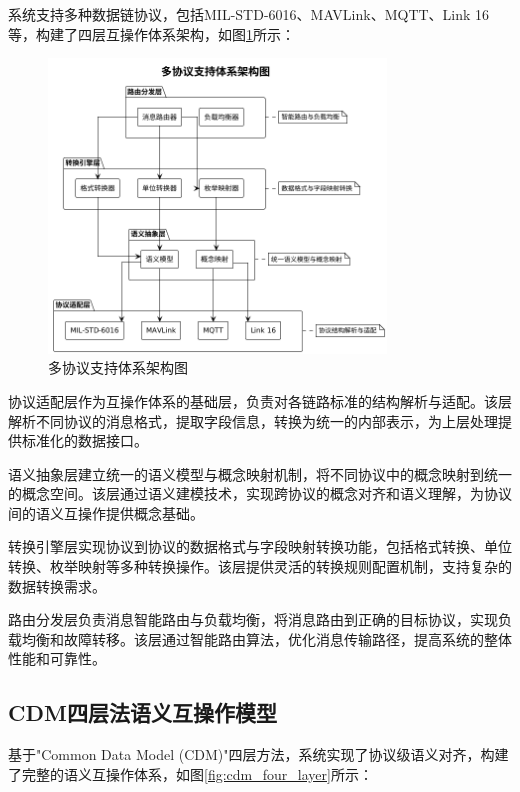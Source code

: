 系统支持多种数据链协议，包括MIL-STD-6016、MAVLink、MQTT、Link 16等，构建了四层互操作体系架构，如图\ref{fig:multi_protocol_support}所示：

\begin{figure}[H]
    \centering
    \includegraphics[width=0.8\textwidth]{chapters/fig-0/multi_protocol_support_simple.png}
    \caption{多协议支持体系架构图}
    \label{fig:multi_protocol_support}
\end{figure}

协议适配层作为互操作体系的基础层，负责对各链路标准的结构解析与适配。该层解析不同协议的消息格式，提取字段信息，转换为统一的内部表示，为上层处理提供标准化的数据接口。

语义抽象层建立统一的语义模型与概念映射机制，将不同协议中的概念映射到统一的概念空间。该层通过语义建模技术，实现跨协议的概念对齐和语义理解，为协议间的语义互操作提供概念基础。

转换引擎层实现协议到协议的数据格式与字段映射转换功能，包括格式转换、单位转换、枚举映射等多种转换操作。该层提供灵活的转换规则配置机制，支持复杂的数据转换需求。

路由分发层负责消息智能路由与负载均衡，将消息路由到正确的目标协议，实现负载均衡和故障转移。该层通过智能路由算法，优化消息传输路径，提高系统的整体性能和可靠性。

\subsection{CDM四层法语义互操作模型}

基于"Common Data Model (CDM)"四层方法，系统实现了协议级语义对齐，构建了完整的语义互操作体系，如图\ref{fig:cdm_four_layer}所示：


